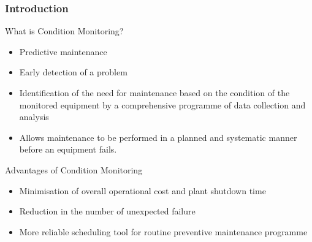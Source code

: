\documentclass[9pt]{beamer}
\begin{document}
\begin{frame}
\frametitle{Introduction}

\begin{block}{What is Condition Monitoring?}
    \begin{itemize} 
    \item Predictive maintenance
    \item Early detection of a problem 
    \item Identification of the need for maintenance based on the condition of the monitored equipment by a comprehensive programme of data collection and analysis
    \item Allows maintenance to be performed in a planned and systematic manner before an equipment fails.
    \end{itemize}
\end{block}

\begin{block}{Advantages of Condition Monitoring}
    \begin{itemize}
    \item Minimisation of overall operational cost and plant shutdown time
    \item Reduction in the number of unexpected failure
    \item More reliable scheduling tool for routine preventive maintenance programme
    \end{itemize}
\end{block}
\end{frame}
\end{document}

